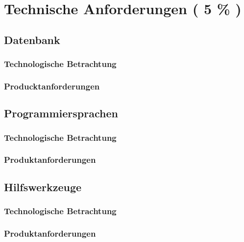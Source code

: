 \chapter{Technische Anforderungen ( 5 \% )}

\section{Datenbank}
\subsection{Technologische Betrachtung}
\subsection{Producktanforderungen}

\section{Programmiersprachen}
\subsection{Technologische Betrachtung}
\subsection{Produktanforderungen}

\section{Hilfswerkzeuge}
\subsection{Technologische Betrachtung}



\subsection{Produktanforderungen}
